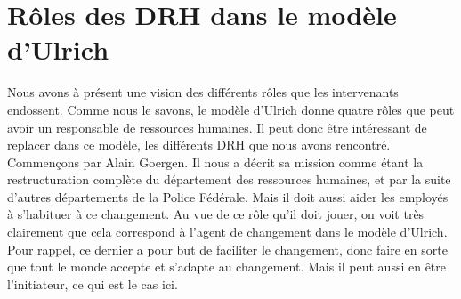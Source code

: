 \section{Rôles des DRH dans le modèle d'Ulrich}

Nous avons à présent une vision des différents rôles que les intervenants endossent. Comme nous le savons, le modèle d'Ulrich donne quatre rôles que peut avoir un responsable de ressources humaines. Il peut donc être intéressant de replacer dans ce modèle, les différents DRH que nous avons rencontré. \\

Commençons par Alain Goergen. Il nous a décrit sa mission comme étant la restructuration complète du département des ressources humaines, et par la suite d'autres départements de la Police Fédérale. Mais il doit aussi aider les employés à s'habituer à ce changement. Au vue de ce rôle qu'il doit jouer, on voit très clairement que cela correspond à l'\og agent de changement \fg{} dans le modèle d'Ulrich. Pour rappel, ce dernier a pour but de faciliter le changement, donc faire en sorte que tout le monde accepte et s'adapte au changement. Mais il peut aussi en être l'initiateur, ce qui est le cas ici. 



